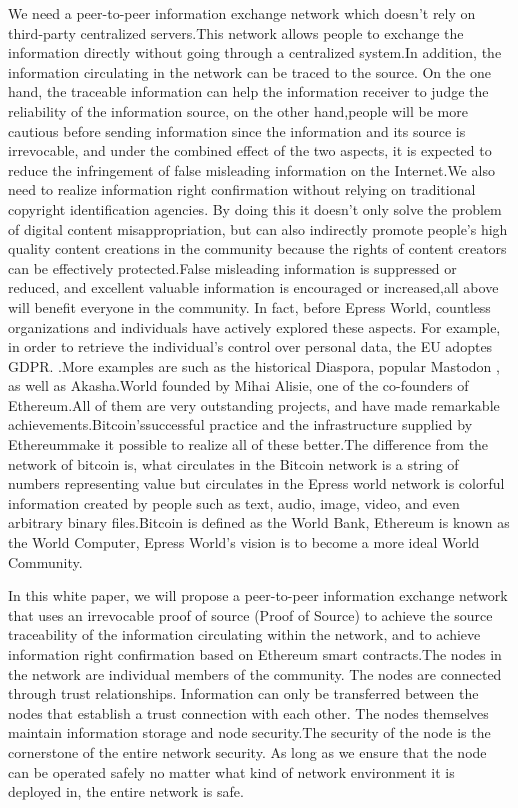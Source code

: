 \documentclass{article}
\begin{document}
    We need a peer-to-peer information exchange network which doesn't rely on third-party centralized servers.This network allows people to exchange the information directly without going through a centralized system.In addition, the information circulating in the network can be traced to the source. On the one hand, the traceable information can help the information receiver to judge the reliability of the information source, on the other hand,people will be more cautious before sending information since the information and its source is irrevocable, and under the combined effect of the two aspects, it is expected to reduce the infringement of false misleading information on the Internet.We also need to realize information right confirmation without relying on traditional copyright identification agencies. By doing this it doesn't only solve the problem of digital content misappropriation, but can also indirectly promote people's high quality content creations in the community because the rights of content creators can be effectively protected.False misleading information is suppressed or reduced, and excellent valuable information is encouraged or increased,all above will benefit everyone in the community.
    In fact, before Epress World, countless organizations and individuals have actively explored these aspects. For example, in order to retrieve the individual's control over personal data, the EU adoptes GDPR.
    \cite{gdpr}.More examples are such as the historical Diaspora\cite{diaspora}, popular Mastodon \cite{mastodon}, as well as Akasha.World \cite{akasha}founded by Mihai Alisie, one of the co-founders of Ethereum.All of them are very outstanding projects, and have made remarkable achievements.Bitcoin's\cite{bitcoin}successful practice and the infrastructure supplied by Ethereum\cite{ethereum}make it possible to realize all of these better.The difference from the network of bitcoin \cite{bitcoin} is, what circulates in the Bitcoin network is a string of numbers representing value but circulates in the Epress world network is colorful information created by people such as  text, audio, image, video, and even arbitrary binary files.Bitcoin is defined as the World Bank, Ethereum is known as the World Computer, Epress World's vision is to become a more ideal World Community.

    In this white paper, we will propose a peer-to-peer information exchange network that uses an irrevocable proof of source (Proof of Source) to achieve the source traceability of the information circulating within the network, and to achieve information right confirmation based on Ethereum smart contracts.The nodes in the network are individual members of the community. The nodes are connected through trust relationships. Information can only be transferred between the nodes that establish a trust connection with each other. The nodes themselves maintain information storage and node security.The security of the node is the cornerstone of the entire network security. As long as we ensure that the node can be operated safely no matter what kind of network environment it is deployed in, the entire network is safe.
\end{document}

